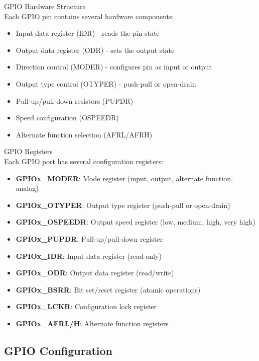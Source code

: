 \begin{concept}{GPIO Hardware Structure}\\
Each GPIO pin contains several hardware components:
\begin{itemize}
    \item Input data register (IDR) - reads the pin state
    \item Output data register (ODR) - sets the output state
    \item Direction control (MODER) - configures pin as input or output
    \item Output type control (OTYPER) - push-pull or open-drain
    \item Pull-up/pull-down resistors (PUPDR)
    \item Speed configuration (OSPEEDR)
    \item Alternate function selection (AFRL/AFRH)
\end{itemize}
\end{concept}

\begin{definition}{GPIO Registers}\\
Each GPIO port has several configuration registers:
\begin{itemize}
    \item \textbf{GPIOx\_MODER}: Mode register (input, output, alternate function, analog)
    \item \textbf{GPIOx\_OTYPER}: Output type register (push-pull or open-drain)
    \item \textbf{GPIOx\_OSPEEDR}: Output speed register (low, medium, high, very high)
    \item \textbf{GPIOx\_PUPDR}: Pull-up/pull-down register
    \item \textbf{GPIOx\_IDR}: Input data register (read-only)
    \item \textbf{GPIOx\_ODR}: Output data register (read/write)
    \item \textbf{GPIOx\_BSRR}: Bit set/reset register (atomic operations)
    \item \textbf{GPIOx\_LCKR}: Configuration lock register
    \item \textbf{GPIOx\_AFRL/H}: Alternate function registers
\end{itemize}
\end{definition}

\columnbreak

\subsection{GPIO Configuration}

